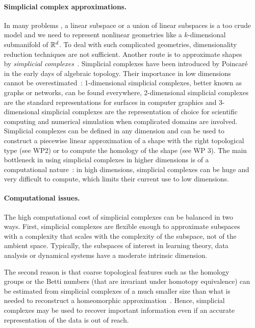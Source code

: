 \paragraph{Simplicial complex approximations.}
In many problems , a linear subspace or a union of linear subspaces is a too crude model and we need to represent nonlinear geometries like a $k$-dimensional submanifold of $\mathbb R^d$.  To deal with such complicated geometries, dimensionality reduction techniques are not sufficient. Another route is to approximate shapes by {\em simplicial complexes}~\cite{hh-ct-2010}.  Simplicial complexes have been introduced by Poincar\'e in the early days of algebraic topology. Their importance in low dimensions cannot be overestimated~: 1-dimensional simplicial complexes, better known as graphs or networks, can be found everywhere, 2-dimensional simplicial complexes are the standard representations for surfaces in computer graphics and 3-dimensional simplicial complexes are the representation of choice for scientific computing and numerical simulation when complicated domains are involved. Simplicial complexes can be defined in any dimension and can be used to construct a piecewise linear approximation of a shape with the right topological type (see WP2) or to 
compute the homology of the shape (see WP 3). The main bottleneck in using simplicial complexes in higher dimensions is of a computational nature~:  in high dimensions, simplicial complexes can be huge and very difficult to compute, which limits their current use to low dimensions.

\paragraph{Computational issues.}
The high computational cost of simplicial complexes can be balanced in two ways. First, simplicial complexes are flexible enough to approximate subspaces with a complexity that scales with the complexity of the subspace, not of the ambient space. Typically, the subspaces of interest 
 in learning theory, data analysis or dynamical systems have a moderate  intrinsic dimension.

The second reason is that coarse topological features such as the homology groups or the Betti numbers (that are invariant under homotopy equivalence) can be estimated from simplicial complexes of a much smaller size than what is needed to reconstruct a homeomorphic approximation~\cite{co-tpr-2008}. Hence, simplicial complexes may be used to recover important information even if an accurate representation of the data is out of reach.

